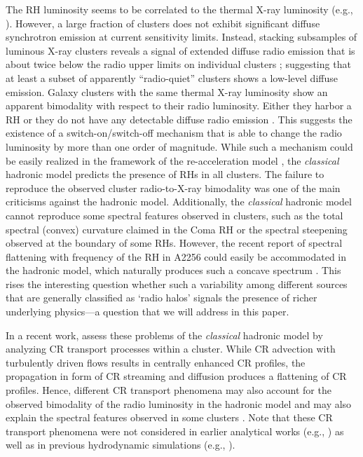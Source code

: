 \documentclass[useAMS,usenatbib]{mn2e}
\begin{document}
The RH luminosity seems to be correlated to the thermal X-ray luminosity (e.g.,
\citealp{2009A&A...507..661B,2011A&A...527A..99E}).  However, a large fraction
of clusters does not exhibit significant diffuse synchrotron emission at current
sensitivity limits. Instead, stacking subsamples of luminous X-ray clusters
reveals a signal of extended diffuse radio emission that is about twice below
the radio upper limits on individual clusters \citep{2011ApJ...740L..28B};
suggesting that at least a subset of apparently ``radio-quiet'' clusters shows a
low-level diffuse emission. Galaxy clusters with the same thermal X-ray
luminosity show an apparent bimodality with respect to their radio
luminosity. Either they harbor a RH or they do not have any detectable diffuse
radio emission \citep{2009A&A...507..661B,2011A&A...527A..99E}. This suggests
the existence of a switch-on/switch-off mechanism that is able to change the
radio luminosity by more than one order of magnitude.  While such a mechanism
could be easily realized in the framework of the re-acceleration model
\citep{2009A&A...507..661B}, the \emph{classical} hadronic model predicts the
presence of RHs in all clusters. The failure to reproduce the observed cluster
radio-to-X-ray bimodality was one of the main criticisms against the hadronic
model.  Additionally, the \emph{classical} hadronic model cannot reproduce some
spectral features observed in clusters, such as the total spectral (convex)
curvature claimed in the Coma RH or the spectral steepening observed at
the boundary of some RHs. However, the recent report of spectral flattening with
frequency of the RH in A2256 \citep{2012A&A...543A..43V} could easily be
accommodated in the hadronic model, which naturally produces such a concave
spectrum \citep{2010MNRAS.409..449P}. This rises the interesting question
whether such a variability among different sources that are generally classified
as `radio halos' signals the presence of richer underlying physics---a question
that we will address in this paper.

In a recent work, \cite{2011A&A...527A..99E} assess these problems of the
\emph{classical} hadronic model by analyzing CR transport processes within a
cluster. While CR advection with turbulently driven flows results in centrally
enhanced CR profiles, the propagation in form of CR streaming and diffusion
produces a flattening of CR profiles. Hence, different CR transport phenomena
may also account for the observed bimodality of the radio luminosity in the
hadronic model and may also explain the spectral features observed in some
clusters \citep{2011A&A...527A..99E}. Note that these CR transport phenomena
were not considered in earlier analytical works (e.g.,
\citealp{2004A&A...413...17P}) as well as in previous hydrodynamic simulations
(e.g., \citealp{2001ApJ...562..233M, 2008MNRAS.385.1211P,
  2010MNRAS.409..449P}).
\end{document}
